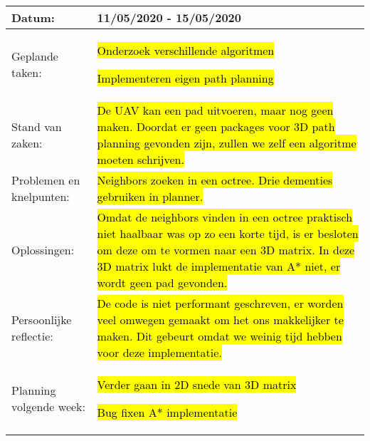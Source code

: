 \begin{tabularx}{\textwidth}{| l | X |}
  \hline
  Datum: & 11/05/2020 - 15/05/2020\\
  \hline
  Geplande taken: &
  \begin{compactitem}
    \item \hl{Onderzoek verschillende algoritmen}
    \item \hl{Implementeren eigen path planning}
  \end{compactitem}\\
  \hline
  Stand van zaken: & \hl{De UAV kan een pad uitvoeren, maar nog geen maken. Doordat er geen packages voor 3D path planning gevonden zijn, zullen we zelf een algoritme moeten schrijven.}\\
  \hline
  Problemen en knelpunten: & \hl{Neighbors zoeken in een octree. Drie dementies gebruiken in planner.}\\
  \hline
  Oplossingen: & \hl{Omdat de neighbors vinden in een octree praktisch niet haalbaar was op zo een korte tijd, is er besloten om deze om te vormen naar een 3D matrix. In deze 3D matrix lukt de implementatie van A* niet, er wordt geen pad gevonden.}\\
  \hline
  Persoonlijke reflectie: & \hl{De code is niet performant geschreven, er worden veel omwegen gemaakt om het ons makkelijker te maken. Dit gebeurt omdat we weinig tijd hebben voor deze implementatie.}\\
  \hline
  Planning volgende week: &
  \begin{compactitem}
    \item \hl{Verder gaan in 2D snede van 3D matrix}
    \item \hl{Bug fixen A* implementatie}
  \end{compactitem}\\
  \hline
\end{tabularx}
